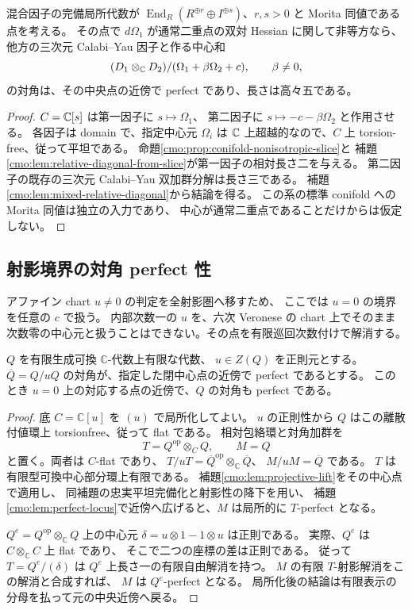 \begin{corollary}[節点を含む混合中心和への適用]
\label{cmo:cor:node-mixed-smooth}
混合因子の完備局所代数が
$\operatorname{End}_R(R^{\oplus r}\oplus I^{\oplus s})$、$r,s>0$ と Morita 同値である点を考える。
その点で $d\Omega_1$ が通常二重点の双対 Hessian に関して非等方なら、
他方の三次元 Calabi--Yau 因子と作る中心和
\[
 (D_1\otimes_\mathbb C D_2)/(\Omega_1+\beta\Omega_2+c),\qquad \beta\ne0,
\]
の対角は、その中央点の近傍で perfect であり、長さは高々五である。
\end{corollary}
\begin{proof}
$C=\mathbb C[s]$ は第一因子に $s\mapsto\Omega_1$、
第二因子に $s\mapsto-c-\beta\Omega_2$ と作用させる。
各因子は domain で、指定中心元 $\Omega_i$ は $\mathbb C$ 上超越的なので、$C$ 上 torsion-free、従って平坦である。
命題\ref{cmo:prop:conifold-nonisotropic-slice}と
補題\ref{cmo:lem:relative-diagonal-from-slice}が第一因子の相対長さ二を与える。
第二因子の既存の三次元 Calabi--Yau 双加群分解は長さ三である。
補題\ref{cmo:lem:mixed-relative-diagonal}から結論を得る。
この系の標準 conifold への Morita 同値は独立の入力であり、
中心が通常二重点であることだけからは仮定しない。
\end{proof}

\subsection{射影境界の対角 perfect 性}

アファイン chart $u\ne0$ の判定を全射影圏へ移すため、
ここでは $u=0$ の境界を任意の $c$ で扱う。
内部次数一の $u$ を、六次 Veronese の chart 上でそのまま
次数零の中心元と扱うことはできない。その点を有限巡回次数付けで解消する。

\begin{lemma}
\label{cmo:lem:central-smooth-lift}
$Q$ を有限生成可換 $\mathbb C$-代数上有限な代数、
$u\in Z(Q)$ を正則元とする。
$\overline Q=Q/uQ$ の対角が、指定した閉中心点の近傍で perfect であるとする。
このとき $u=0$ 上の対応する点の近傍で、$Q$ の対角も perfect である。
\end{lemma}
\begin{proof}
底 $C=\mathbb C[u]$ を $(u)$ で局所化してよい。
$u$ の正則性から $Q$ はこの離散付値環上 torsionfree、従って flat である。
相対包絡環と対角加群を
\[
 T=Q^{\mathrm{op}}\otimes_C Q,\qquad M=Q
\]
と置く。両者は $C$-flat であり、
$T/uT=\overline Q^{\mathrm{op}}\otimes_{\mathbb C}\overline Q$、
$M/uM=\overline Q$ である。
$T$ は有限型可換中心部分環上有限である。
補題\ref{cmo:lem:projective-lift}をその中心点で適用し、
同補題の忠実平坦完備化と射影性の降下を用い、
補題\ref{cmo:lem:perfect-locus}で近傍へ広げると、$M$ は局所的に $T$-perfect となる。

$Q^e=Q^{\mathrm{op}}\otimes_{\mathbb C}Q$ 上の中心元
$\delta=u\otimes1-1\otimes u$ は正則である。
実際、$Q^e$ は $C\otimes_{\mathbb C}C$ 上 flat であり、
そこで二つの座標の差は正則である。
従って $T=Q^e/(\delta)$ は $Q^e$ 上長さ一の有限自由解消を持つ。
$M$ の有限 $T$-射影解消をこの解消と合成すれば、
$M$ は $Q^e$-perfect となる。
局所化後の結論は有限表示の分母を払って元の中央近傍へ戻る。
\end{proof}

